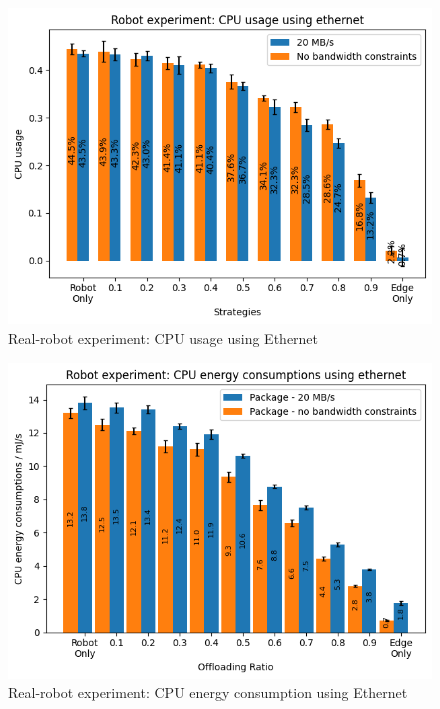 \begin{figure}
    \centering
    \includegraphics[width=\linewidth]{figures/experiment/real_robot/eth/cpu_percentage.png}
    \caption{Real-robot experiment: CPU usage using Ethernet}
    \label{fig:real_robot_experiment:eth_cpu_percentage}
\end{figure}

\begin{figure}
    \centering
    \includegraphics[width=\linewidth]{figures/experiment/real_robot/eth/cpu_energy_consumption.png}
    \caption{Real-robot experiment: CPU energy consumption using Ethernet}
    \label{fig:real_robot_experiment:eth_cpu_energy_consumption}
\end{figure}

